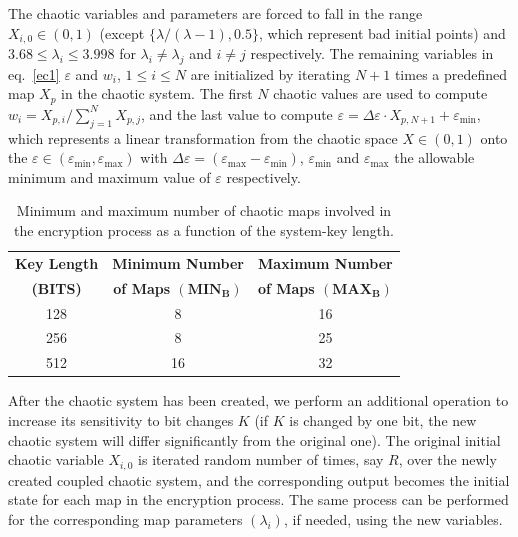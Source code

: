 \documentclass[preprint]{elsarticle}
\begin{document}
The chaotic variables and parameters are forced to fall in the range $X_{i,0} \in (0,1)$ (except $\{\lambda /(\lambda -1), 0.5\}$, which represent bad initial points) and $3.68 \leq \lambda_{i} \leq 3.998$ for $\lambda_{i} \neq \lambda_{j}$ and $i \neq j$ respectively. The remaining variables in eq.~\ref{ec1} $\varepsilon$ and $w_{i}$, $1 \leq i \leq N$ are initialized by iterating $N+1$ times a predefined map $X_{p}$ in the chaotic system. The first $N$ chaotic values are used to compute $w_{i}= X_{p,i} / \sum_{j=1}^{N}X_{p,j}$, and the last value to compute $\varepsilon= \Delta \varepsilon \cdot X_{p,N+1}+ \varepsilon _{\min}$, which represents a linear transformation from the chaotic space $X \in (0,1)$ onto the $\varepsilon \in (\varepsilon_{\min}, \varepsilon_{\max} )$  with $\Delta \varepsilon = (\varepsilon_{\max} - \varepsilon_{\min})$, $\varepsilon_{\min}$ and $\varepsilon_{\max}$ the allowable minimum and maximum value of $\varepsilon$ respectively.

\begin{table}[!ht]
\centering
\begin{tabular}{ c c c  }
\hline 
    \textbf{Key Length}   &
 \textbf{Minimum Number}&
\textbf{Maximum Number} \\ 
    \textbf{(BITS)}   &
 \textbf{of Maps $(\mathbf{MIN_{B}})$}&
\textbf{of Maps $(\mathbf{MAX_{B}})$} \\ 
\hline
\multicolumn{1}{c}{128} 	 &  \multicolumn{1}{c}{8}    &  \multicolumn{1}{c}{16}      \\ \hline
\multicolumn{1}{c}{256}   & \multicolumn{1}{c}{8}    & \multicolumn{1}{c}{25}    \\ \hline
\multicolumn{1}{c}{512}   &	\multicolumn{1}{c}{16}   &  \multicolumn{1}{c}{32}  \\
\hline 
\end{tabular}
\caption{Minimum and maximum number of chaotic maps involved in the encryption process as a function of the system-key length.
}
\label{table1}
\end{table}


After the chaotic system has been created, we perform an additional operation to increase its sensitivity to bit changes $K$ (if $K$ is changed by one bit, the new chaotic system will differ significantly from the original one). The original initial chaotic variable $X_{i,0}$ is iterated random number of times, say $R$, over the newly created coupled chaotic system, and the corresponding output becomes the initial state for each map in the encryption process. The same process can be performed for the corresponding map parameters $(\lambda_{i})$, if needed, using the new variables.
\end{document}
